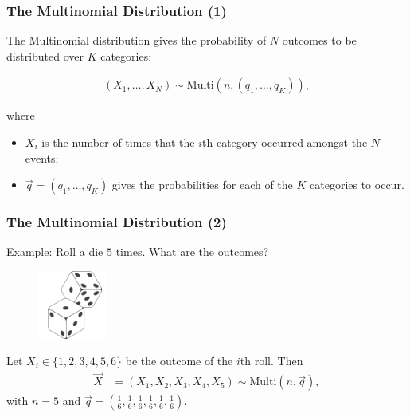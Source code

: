 \documentclass[12pt]{beamer}
\newcommand{\Multi}{\text{Multi}}
\begin{document}
\begin{frame}
    \frametitle{The Multinomial Distribution (1)}

    The Multinomial distribution gives the probability 
    of $N$ outcomes to be distributed over $K$ categories:

    \begin{align*}
        (X_1, \dots, X_N) \sim  \Multi(n, (q_1, \dots, q_K)),
    \end{align*}

    where 
    
    \begin{itemize}
        \item $X_i$ is the number of times that the $i$th category occurred amongst
        the $N$ events;
        \item $\vec{q} = (q_1, \dots, q_K)$ gives the probabilities
        for each of the $K$ categories to occur.
    \end{itemize}

\end{frame}

\begin{frame}
    \frametitle{The Multinomial Distribution (2)}

    Example: Roll a die $5$ times. What are the outcomes?

    \bigskip

    \begin{figure}[!h]
    \includegraphics[width=0.2\textwidth]{images/dice.png}
    \end{figure}

    \bigskip

    Let $X_i \in \{1, 2, 3, 4, 5, 6\}$ be the outcome of the $i$th roll.
    Then 
    \begin{align*}
        \vec{X} &= (X_1, X_2, X_3, X_4, X_5) \sim \Multi(n, \vec{q}),
    \end{align*}
    with $n=5$ and $\vec{q} = \left(\tfrac{1}{6}, \tfrac{1}{6}, \tfrac{1}{6},
    \tfrac{1}{6}, \tfrac{1}{6}, \tfrac{1}{6}\right)$.

\end{frame}
\end{document}

